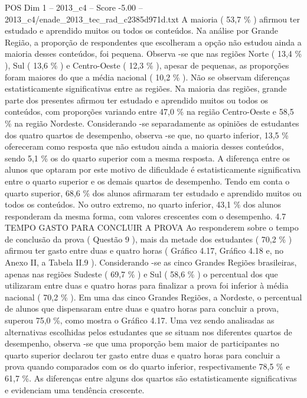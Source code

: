 \begin{textsample}{POS Dim 1 – 2013\_c4 – Score -5.00 – 2013\_c4/enade\_2013\_tec\_rad\_c2385d971d.txt}
A maioria ( 53,7 \% ) afirmou ter estudado e aprendido muitos ou todos os conteúdos.
Na análise por Grande Região, a proporção de respondentes que escolheram a opção não estudou ainda a maioria desses conteúdos, foi pequena.
Observa -se que nas regiões Norte ( 13,4 \% ), Sul ( 13,6 \% ) e Centro-Oeste ( 12,3 \% ), apesar de pequenas, as proporções foram maiores do que a média nacional ( 10,2 \% ).
Não se observam diferenças estatisticamente significativas entre as regiões.
Na maioria das regiões, grande parte dos presentes afirmou ter estudado e aprendido muitos ou todos os conteúdos, com proporções variando entre 47,0 \% na região Centro-Oeste e 58,5 \% na região Nordeste.
Considerando -se separadamente as opiniões de estudantes dos quatro quartos de desempenho, observa -se que, no quarto inferior, 13,5 \% ofereceram como resposta que não estudou ainda a maioria desses conteúdos, sendo 5,1 \% os do quarto superior com a mesma resposta.
A diferença entre os alunos que optaram por este motivo de dificuldade é estatisticamente significativa entre o quarto superior e os demais quartos de desempenho.
Tendo em conta o quarto superior, 68,6 \% dos alunos afirmaram ter estudado e aprendido muitos ou todos os conteúdos.
No outro extremo, no quarto inferior, 43,1 \% dos alunos responderam da mesma forma, com valores crescentes com o desempenho. 4.7 TEMPO GASTO PARA CONCLUIR A PROVA Ao responderem sobre o tempo de conclusão da prova ( Questão 9 ), mais da metade dos estudantes ( 70,2 \% ) afirmou ter gasto entre duas e quatro horas ( Gráfico 4.17, Gráfico 4.18 e, no Anexo II, a Tabela II.9 ).
Considerando -se as cinco Grandes Regiões brasileiras, apenas nas regiões Sudeste ( 69,7 \% ) e Sul ( 58,6 \% ) o percentual dos que utilizaram entre duas e quatro horas para finalizar a prova foi inferior à média nacional ( 70,2 \% ).
Em uma das cinco Grandes Regiões, a Nordeste, o percentual de alunos que dispensaram entre duas e quatro horas para concluir a prova, superou 75,0 \%, como mostra o Gráfico 4.17.
Uma vez sendo analisadas as alternativas escolhidas pelos estudantes que se situam nos diferentes quartos de desempenho, observa -se que uma proporção bem maior de participantes no quarto superior declarou ter gasto entre duas e quatro horas para concluir a prova quando comparados com os do quarto inferior, respectivamente 78,5 \% e 61,7 \%.
As diferenças entre alguns dos quartos são estatisticamente significativas e evidenciam uma tendência crescente.

\end{textsample}
